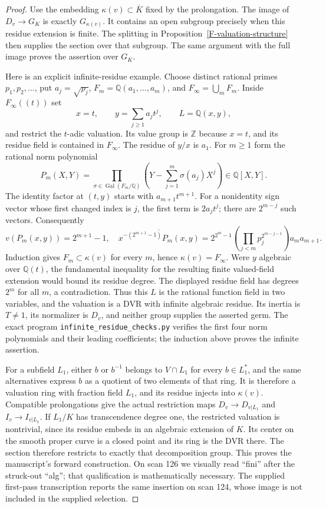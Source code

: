 \begin{proof}
Use the embedding $\kappa(v)\subset\overline K$ fixed by the
prolongation. The image of $D_v\to G_K$ is exactly
$G_{\kappa(v)}$. It contains an open subgroup precisely when
this residue extension is finite. The splitting in
Proposition~\ref{F-valuation-structure} then supplies the section
over that subgroup. The same argument with the full image proves
the assertion over $G_K$.

Here is an explicit infinite-residue example. Choose distinct
rational primes $p_1,p_2,\ldots$, put $a_j=\sqrt{p_j}$,
$F_m=\mathbb Q(a_1,\ldots,a_m)$, and $F_\infty=\bigcup_mF_m$.
Inside $F_\infty((t))$ set
\[
 x=t,\qquad y=\sum_{j\geq1}a_jt^j,
 \qquad L=\mathbb Q(x,y),
\]
and restrict the $t$-adic valuation. Its value group is
$\mathbb Z$ because $x=t$, and its residue field is contained
in $F_\infty$. The residue of $y/x$ is $a_1$. For $m\geq1$
form the rational norm polynomial
\[
 P_m(X,Y)=\prod_{\sigma\in\operatorname{Gal}(F_m/\mathbb Q)}
 \left(Y-\sum_{j=1}^m\sigma(a_j)X^j\right)\in\mathbb Q[X,Y].
\]
The identity factor at $(t,y)$ starts with $a_{m+1}t^{m+1}$.
For a nonidentity sign vector whose first changed index is $j$,
the first term is $2a_jt^j$; there are $2^{m-j}$ such vectors.
Consequently
\[
 v(P_m(x,y))=2^{m+1}-1,
 \quad
 \overline{x^{-(2^{m+1}-1)}P_m(x,y)}
 =2^{2^m-1}\!\left(\prod_{j<m}p_j^{2^{m-j-1}}\right)
   a_m a_{m+1}.
\]
Induction gives $F_m\subset\kappa(v)$ for every $m$, hence
$\kappa(v)=F_\infty$. Were $y$ algebraic over $\mathbb Q(t)$,
the fundamental inequality for the resulting finite valued-field
extension would bound its residue degree. The displayed residue
field has degrees $2^m$ for all $m$, a contradiction. Thus this
$L$ is the rational function field in two variables, and the
valuation is a DVR with infinite algebraic residue. Its inertia
is $T\ne1$, its normalizer is $D_v$, and neither group supplies
the asserted germ. The exact program
\texttt{infinite\_residue\_checks.py} verifies the first four
norm polynomials and their leading coefficients; the induction
above proves the infinite assertion.

For a subfield $L_1$, either $b$ or $b^{-1}$ belongs to
$V\cap L_1$ for every $b\in L_1^*$, and the same alternatives
express $b$ as a quotient of two elements of that ring. It is
therefore a valuation ring with fraction field $L_1$, and its
residue injects into $\kappa(v)$. Compatible prolongations give
the actual restriction maps $D_v\to D_{v|L_1}$ and
$I_v\to I_{v|L_1}$. If $L_1/K$ has transcendence degree one,
the restricted valuation is nontrivial, since its residue embeds
in an algebraic extension of $K$. Its center on the smooth proper
curve is a closed point and its ring is the DVR there. The
section therefore restricts to exactly that decomposition group.
This proves the manuscript's forward construction. On scan 126
we visually read ``fini'' after the struck-out ``alg''; that
qualification is mathematically necessary. The supplied first-pass
transcription reports the same insertion on scan 124, whose image
is not included in the supplied selection.
\end{proof}

